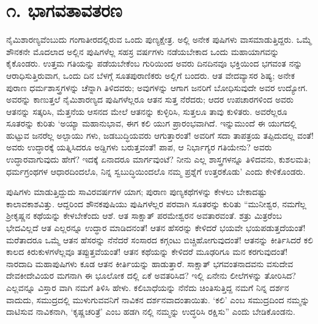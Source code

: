 
\chapter{೧. ಭಾಗವತಾವತರಣ}

ನೈಮಿಶಾರಣ್ಯವೆಂಬುದು ಗಂಗಾತೀರದಲ್ಲಿರುವ ಒಂದು ಪುಣ್ಯಕ್ಷೇತ್ರ. ಅಲ್ಲಿ ಅನೇಕ ಪುಷಿಗಳು ವಾಸಮಾಡುತ್ತಿದ್ದರು. ಒಮ್ಮೆ ಶೌನಕನೇ ಮೊದಲಾದ ಅಲ್ಲಿನ ಪುಷಿಗಳೆಲ್ಲ ಸಹಸ್ರ ವರ್ಷಗಳು ನಡೆಯಬೇಕಾದ ಒಂದು ಮಹಾಯಾಗವನ್ನು ಕೈಕೊಂಡರು. ಉತ್ತಮ ಗತಿಯನ್ನು ಪಡೆಯಬೇಕೆಂಬ ಗುರಿಯಿಂದ ಅವರು ದಿನದಿನವೂ ಭಕ್ತಿಯಿಂದ ಭಗವಂತ ನನ್ನು ಆರಾಧಿಸುತ್ತಿರುವಾಗ, ಒಂದು ದಿನ ಬೆಳಗ್ಗೆ ಸೂತಪುರಾಣಿಕರು ಅಲ್ಲಿಗೆ ಬಂದರು. ಆತ ವೇದವ್ಯಾಸರ ಶಿಷ್ಯ; ಅನೇಕ ಪುರಾಣ ಧರ್ಮಶಾಸ್ತ್ರಗಳನ್ನು ಚೆನ್ನಾಗಿ ತಿಳಿದವರು; ಅವುಗಳನ್ನು ಆಗಾಗ ಜನರಿಗೆ ಬೋಧಿಸುವುದೇ ಅವರ ಉದ್ಯೋಗ. ಅವರನ್ನು ಕಾಣುತ್ತಲೆ ನೈಮಿಶಾರಣ್ಯದ ಪುಷಿಗಳೆಲ್ಲರೂ ಆತನ ಸುತ್ತ ನೆರೆದರು; ಆದರ ಉಪಚಾರಗಳಿಂದ ಅವರು ಆತನನ್ನು ಸತ್ಕರಿಸಿ, ಮೆತ್ತನೆಯ ಆಸನದ ಮೇಲೆ ಆತನನ್ನು ಕುಳ್ಳಿರಿಸಿ, ಸುತ್ತಲೂ ತಾವು ಕುಳಿತರು. ಅವರೆಲ್ಲರೂ ಸೂತರನ್ನು ಕುರಿತು ‘ಅಯ್ಯಾ ಮಹಾನುಭಾವ, ಈಗ ಕಲಿ ಯುಗ ಪ್ರಾರಂಭವಾಗಿದೆ. ಇನ್ನುಮುಂದೆ ಈ ಯುಗದಲ್ಲಿ ಹುಟ್ಟುವ ಜನರೆಲ್ಲ ಅಲ್ಪಾಯು ಗಳು, ಜಡಬುದ್ಧಿಯವರು ಆಗುತ್ತಾರಂತೆ! ಅವರಿಗೆ ಸದಾ ತಾಪತ್ರಯ ತಪ್ಪಿದುದಲ್ಲ ವಂತೆ! ಅವರು ಉದ್ಧಾರಕ್ಕೆ ಯತ್ನಿಸಿದರೂ ಅಡ್ಡಿಗಳು ಬರುತ್ತವಂತೆ! ಪಾಪ, ಆ ನಿರ್ಭಾಗ್ಯರ ಗತಿಯೇನು? ಅವರು ಉದ್ಧಾರವಾಗುವುದು ಹೇಗೆ? ಇದಕ್ಕೆ ಏನಾದರೂ ಮಾರ್ಗವುಂಟೆ? ನೀನು ಎಲ್ಲ ಶಾಸ್ತ್ರಗಳನ್ನೂ ತಿಳಿದವನು, ಕುಶಲಮತಿ; ಧರ್ಮಗ್ರಂಥಗಳ ಆಧಾರದಿಂದಲೊ, ನಿನ್ನ ಸ್ವಬುದ್ಧಿಯಿಂದಲೊ ನಮ್ಮ ಪ್ರಶ್ನೆಗೆ ಉತ್ತರಕೊಡು’ ಎಂದು ಕೇಳಿಕೊಂಡರು.

ಪುಷಿಗಳು ಮಾಡುತ್ತಿದ್ದುದು ಸಾವಿರವರ್ಷಗಳ ಯಾಗ; ಪುರಾಣ ಪುಣ್ಯಕಥೆಗಳನ್ನು ಕೇಳಲು ಬೇಕಾದಷ್ಟು ಕಾಲಾವಕಾಶವಿತ್ತು. ಆದ್ದರಿಂದ ಶೌನಕಪುಷಿಯು ಪುಷಿಗಳೆಲ್ಲರ ಪರವಾಗಿ ಸೂತರನ್ನು ಕುರಿತು “ಮುನೀಶ್ವರ, ನಮಗೆಲ್ಲ ಶ್ರೀಕೃಷ್ಣನ ಕಥೆಯನ್ನು ಕೇಳಬೇಕೆಂದು ಆಶೆ. ಆತ ಸಾಕ್ಷಾತ್ ಪರಮೇಶ್ವರನ ಅವತಾರವಂತೆ. ಶತ್ರು ಮಿತ್ರರೆಂಬ ಭೇದವಿಲ್ಲದೆ ಆತ ಎಲ್ಲರನ್ನೂ ಉದ್ಧಾರ ಮಾಡಿದನಂತೆ! ಆತನ ಹೆಸರನ್ನು ಕೇಳಿದರೆ ಭಯವೇ ಭಯಪಡುತ್ತದೆಯಂತೆ! ಮರೆತಾದರೂ ಒಮ್ಮೆ ಆತನ ಹೆಸರನ್ನು ನೆನೆದರೆ ಸಂಸಾರದ ಕಗ್ಗಂಟು ಬಿಚ್ಚಿಹೋಗುವುದಂತೆ! ಆತನನ್ನು ಕೀರ್ತಿಸಿದರೆ ಕಲಿ ಕಾಲದ ಕಿರುಕುಳಗಳೆಲ್ಲವೂ ತಪ್ಪುತ್ತವೆಯಂತೆ! ಆತನ ಕಥೆಯನ್ನು ಕೇಳಿದರೆ ಮೂಢರಿಗೂ ಮನ ಕರಗುವುದಂತೆ! ನಾರದಾದಿ ಮಹಾಪುಷಿಗಳು ಕೂಡ ಆತನ ಕೀರ್ತಿಯನ್ನು ಹಾಡುತ್ತಾರೆ. ಸಾಕ್ಷಾತ್ ಭಗವಂತನಾದವನು ವಸುದೇವ ದೇವಕೀದೇವಿಯರ ಮಗನಾಗಿ ಈ ಭೂಲೋಕ ದಲ್ಲಿ ಏಕೆ ಅವತರಿಸಿದ? ಇಲ್ಲಿ ಏನೇನು ಲೀಲೆಗಳನ್ನು ತೋರಿಸಿದ? ಎಲ್ಲವನ್ನೂ ವಿಸ್ತಾರ ವಾಗಿ ನಮಗೆ ತಿಳಿಸಿ ಹೇಳು. ಕಲಿಬಾಧೆಯನ್ನು ನೆನೆದು ಚಿಂತಿಸುತ್ತಿದ್ದ ನಮಗೆ ನಿನ್ನ ದರ್ಶನ ವಾದುದು, ಸಮುದ್ರದಲ್ಲಿ ಮುಳುಗುವವನಿಗೆ ನಾವಿಕನ ದರ್ಶನವಾದಂತಾಯಿತು. ‘ಕಲಿ’ ಎಂಬ ಸಮುದ್ರದಿಂದ ನಮ್ಮನ್ನು ದಾಟಿಸುವ ನಾವಿಕನಾಗಿ, ‘ಕೃಷ್ಣಚರಿತ್ರೆ’ ಎಂಬ ಹಡಗಿ ನಲ್ಲಿ ನಮ್ಮನ್ನು ಉದ್ಧರಿಸಿ ರಕ್ಷಿಸು” ಎಂದು ಬೇಡಿಕೊಂಡನು.

